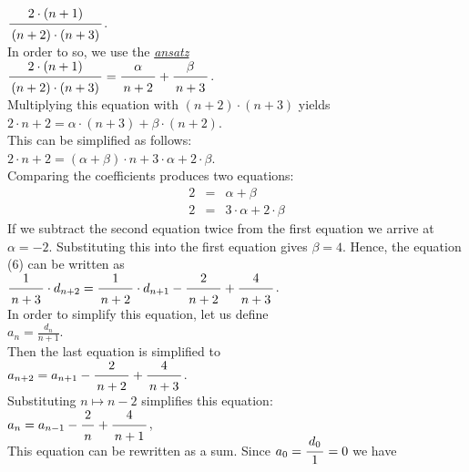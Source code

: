 $\bruch{2\cdot(n+1)}{(n+2)\cdot(n+3)}$.
\\[0.2cm] 
In order to so, we use the \href{http://en.wikipedia.org/wiki/Ansatz}{\emph{ansatz}}
\\[0.2cm]
\hspace*{1.3cm}
$\bruch{2\cdot(n+1)}{(n+2)\cdot(n+3)} = \bruch{\alpha}{n+2} + \bruch{\beta}{n+3}$.
\\[0.2cm] 
Multiplying this equation with $(n+2) \cdot (n+3)$ yields
\\[0.2cm]
\hspace*{1.3cm}
$ 2\cdot n + 2 = \alpha \cdot (n+3) + \beta \cdot (n+2)$.
\\[0.2cm]
This can be simplified as follows:
\\[0.2cm]
\hspace*{1.3cm}
$2\cdot n + 2 = (\alpha + \beta) \cdot n + 3 \cdot \alpha  + 2 \cdot \beta$.
\\[0.2cm]
Comparing the coefficients produces two equations:
\begin{eqnarray*}
  2 & = & \alpha + \beta \\
  2 & = & 3 \cdot \alpha + 2 \cdot \beta 
\end{eqnarray*}
If we subtract the second equation twice from the first equation we arrive at
 $\alpha = -2$.  Substituting this into the first equation gives $\beta = 4$.
Hence, the equation (6) can be written as
\\[0.2cm]
\hspace*{1.3cm}
$\bruch{1}{n+3} \cdot d_{n+2} = \bruch{1}{n+2}\cdot d_{n+1} - \bruch{2}{n+2} + \bruch{4}{n+3}$.  
\\[0.2cm]  
In order to simplify this equation, let us define
\\[0.2cm]
\hspace*{1.3cm}
 $\displaystyle a_n = \frac{d_n}{n+1}$. 
\\[0.2cm] 
Then the last equation is simplified to
\\[0.2cm]
\hspace*{1.3cm}
$a_{n+2} = a_{n+1} - \bruch{2}{n+2} + \bruch{4}{n+3}$.
\\[0.2cm] 
Substituting $n \mapsto n-2$ simplifies this equation: 
\\[0.2cm]
\hspace*{1.3cm}
$a_{n} = a_{n-1} - \bruch{2}{n} + \bruch{4}{n+1}$,
\\[0.2cm] 
This equation can be rewritten as a sum.  Since $a_0 = \bruch{d_0}{1} = 0$
we have
\\[0.2cm]
\hspace*{1.3cm}
